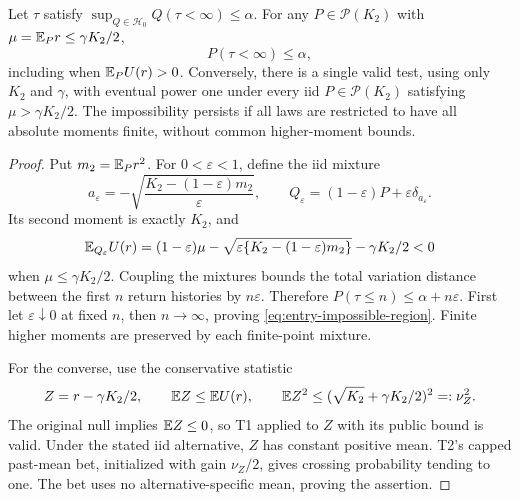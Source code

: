 \begin{theorem}
\label{thm:entry-frontier}
Let $\tau$ satisfy
$\sup_{Q\in\mathcal H_0}Q(\tau<\infty)\le\alpha$. For any
$P\in\mathcal P(K_2)$ with $\mu=\mathbb E_P r\le\gamma K_2/2$,
\begin{equation}
 P(\tau<\infty)\le\alpha,
 \label{eq:entry-impossible-region}
\end{equation}
including when $\mathbb E_P U(r)>0$. Conversely, there is a single valid test,
using only $K_2$ and $\gamma$, with eventual power one under every iid
$P\in\mathcal P(K_2)$ satisfying $\mu>\gamma K_2/2$.
The impossibility persists if all laws are restricted to have all absolute
moments finite, without common higher-moment bounds.
\end{theorem}
\begin{proof}
Put $m_2=\mathbb E_P r^2$. For $0<\varepsilon<1$, define the iid mixture
\begin{equation}
 a_\varepsilon=-\sqrt{\frac{K_2-(1-\varepsilon)m_2}{\varepsilon}},\qquad
 Q_\varepsilon=(1-\varepsilon)P+\varepsilon\delta_{a_\varepsilon}.
 \label{eq:entry-contamination}
\end{equation}
Its second moment is exactly $K_2$, and
\[
 \mathbb E_{Q_\varepsilon}U(r)
 =(1-\varepsilon)\mu
 -\sqrt{\varepsilon\{K_2-(1-\varepsilon)m_2\}}-\gamma K_2/2<0
\]
when $\mu\le\gamma K_2/2$. Coupling the mixtures bounds the total variation
distance between the first $n$ return histories by $n\varepsilon$. Therefore
$P(\tau\le n)\le\alpha+n\varepsilon$. First let $\varepsilon\downarrow0$
at fixed $n$, then $n\to\infty$, proving \eqref{eq:entry-impossible-region}.
Finite higher moments are preserved by each finite-point mixture.

For the converse, use the conservative statistic
\begin{equation}
 Z=r-\gamma K_2/2,\qquad
 \mathbb E Z\le\mathbb E U(r),\qquad
 \mathbb E Z^2\le(\sqrt{K_2}+\gamma K_2/2)^2=:\nu_Z^2.
 \label{eq:entry-surrogate}
\end{equation}
The original null implies $\mathbb E Z\le0$, so T1 applied to $Z$ with its public
bound is valid. Under the stated iid alternative, $Z$ has constant positive
mean. T2's capped past-mean bet, initialized with gain $\nu_Z/2$, gives crossing probability tending to
one. The bet uses no alternative-specific mean, proving the assertion.
\end{proof}

